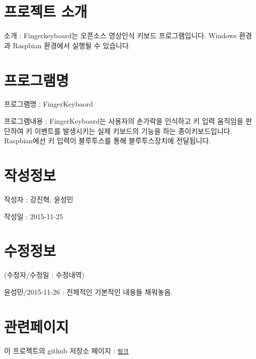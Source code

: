 \hypertarget{index_intro}{}\section{프로젝트 소개}\label{index_intro}

\begin{DoxyItemize}
\item 소개 \+: Fingerkeyboard는 오픈소스 영상인식 키보드 프로그램입니다. Windows 환경과 Raspbian 환경에서 실행될 수 있습니다.
\end{DoxyItemize}\hypertarget{index_Program}{}\section{프로그램명}\label{index_Program}

\begin{DoxyItemize}
\item 프로그램명 \+: Finger\+Keybaord
\item 프로그램내용 \+: Finger\+Keyboard는 사용자의 손가락을 인식하고 키 입력 움직임을 판단하여 키 이벤트를 발생시키는 실제 키보드의 기능을 하는 종이키보드입니다. Raspbian에선 키 입력이 블루투스를 통해 블루투스장치에 전달됩니다.
\end{DoxyItemize}\hypertarget{index_CREATEINFO}{}\section{작성정보}\label{index_CREATEINFO}

\begin{DoxyItemize}
\item 작성자 \+: 강진혁, 윤성민
\item 작성일 \+: 2015-\/11-\/25
\end{DoxyItemize}\hypertarget{index_MODIFYINFO}{}\section{수정정보}\label{index_MODIFYINFO}
(수정자/수정일 \+: 수정내역)
\begin{DoxyItemize}
\item 윤성민/2015-\/11-\/26 \+: 전체적인 기본적인 내용들 채워놓음.
\end{DoxyItemize}\hypertarget{index_addition}{}\section{관련페이지}\label{index_addition}

\begin{DoxyItemize}
\item 이 프로젝트의 github 저장소 페이지 \+: \href{https://github.com/FingerKeyboard-jh-sm/FingerKeyboard}{\tt 링크} 
\end{DoxyItemize}
